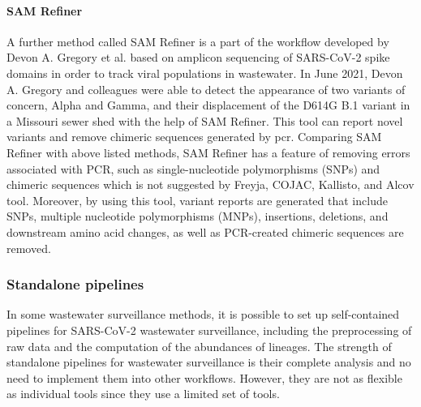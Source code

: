         \paragraph{SAM Refiner}
        A further method called SAM Refiner is a part of the workflow developed by Devon A. Gregory et al. \cite{gregory2021} based on amplicon sequencing of SARS-CoV-2 spike domains in order to track viral populations in wastewater. In June 2021, Devon A. Gregory and colleagues were able to detect the appearance of two variants of concern, Alpha and Gamma, and their displacement of the D614G B.1 variant in a Missouri sewer shed with the help of SAM Refiner. This tool can report novel variants and remove chimeric sequences generated by \acrshort{pcr}. Comparing SAM Refiner with above listed methods, SAM Refiner has a feature of removing errors associated with PCR, such as single-nucleotide polymorphisms (SNPs) and chimeric sequences which is not suggested by Freyja, COJAC, Kallisto, and Alcov tool. Moreover, by using this tool, variant reports are generated that include SNPs, multiple nucleotide polymorphisms (MNPs), insertions, deletions, and downstream amino acid changes, as well as PCR-created chimeric sequences are removed. 
        
        \subsubsection{Standalone pipelines} \label{sec:prior:methods:pipelines}
        In some wastewater surveillance methods, it is possible to set up self-contained pipelines for SARS-CoV-2 wastewater surveillance, including the preprocessing of raw data and the computation of the abundances of lineages. The strength of standalone pipelines for wastewater surveillance is their complete analysis and no need to implement them into other workflows. However, they are not as flexible as individual tools since they use a limited set of tools.

